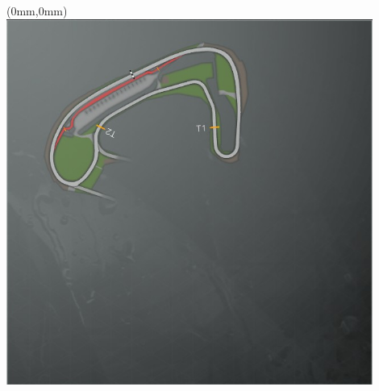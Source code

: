 \null\newpage
\begin{textblock*}{30mm}(0mm,0mm)%
\includegraphics[width=120mm]{TR/2015-05-20_00008.png}
\end{textblock*}
